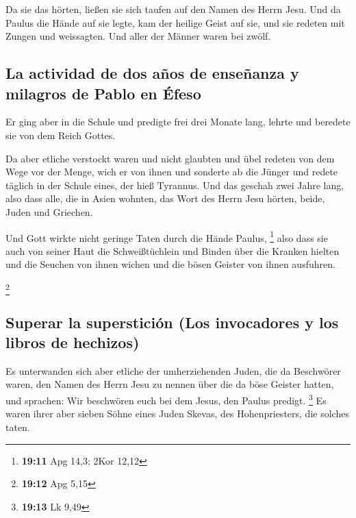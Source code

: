  Da sie das hörten, ließen sie sich taufen auf den Namen
des Herrn Jesu.  Und da Paulus die Hände auf sie legte,
kam der heilige Geist auf sie, und sie redeten mit Zungen und
weissagten.  Und aller der Männer waren bei zwölf.

\hypertarget{la-actividad-de-dos-auxf1os-de-enseuxf1anza-y-milagros-de-pablo-en-uxe9feso}{%
\subsection{La actividad de dos años de enseñanza y milagros de Pablo en
Éfeso}\label{la-actividad-de-dos-auxf1os-de-enseuxf1anza-y-milagros-de-pablo-en-uxe9feso}}

 Er ging aber in die Schule und predigte frei drei Monate
lang, lehrte und beredete sie von dem Reich Gottes.

 Da aber etliche verstockt waren und nicht glaubten und
übel redeten von dem Wege vor der Menge, wich er von ihnen und sonderte
ab die Jünger und redete täglich in der Schule eines, der hieß Tyrannus.
 Und das geschah zwei Jahre lang, also dass alle, die in
Asien wohnten, das Wort des Herrn Jesu hörten, beide, Juden und
Griechen.

 Und Gott wirkte nicht geringe Taten durch die Hände
Paulus, \footnote{\textbf{19:11} Apg 14,3; 2Kor 12,12} 
also dass sie auch von seiner Haut die Schweißtüchlein und Binden über
die Kranken hielten und die Seuchen von ihnen wichen und die bösen
Geister von ihnen ausfuhren.

\footnote{\textbf{19:12} Apg 5,15}

\hypertarget{superar-la-supersticiuxf3n-los-invocadores-y-los-libros-de-hechizos}{%
\subsection{Superar la superstición (Los invocadores y los libros de
hechizos)}\label{superar-la-supersticiuxf3n-los-invocadores-y-los-libros-de-hechizos}}

 Es unterwanden sich aber etliche der umherziehenden
Juden, die da Beschwörer waren, den Namen des Herrn Jesu zu nennen über
die da böse Geister hatten, und sprachen: Wir beschwören euch bei dem
Jesus, den Paulus predigt. \footnote{\textbf{19:13} Lk 9,49}
 Es waren ihrer aber sieben Söhne eines Juden Skevas, des
Hohenpriesters, die solches taten.

